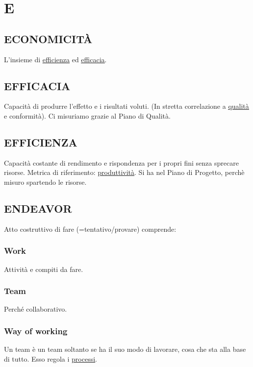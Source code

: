 \newpage
	\section{E} \label{sec:E}
	
		\subsection{ECONOMICITÀ}  \label{economicita}
		L'insieme di \underline{\hyperref[efficienza]{efficienza}} ed \underline{\hyperref[efficacia]{efficacia}}.
		
		\subsection{EFFICACIA}  \label{efficacia}
		Capacità di produrre l'effetto e i risultati voluti. (In stretta correlazione a \underline{\hyperref[qualita]{qualità}} e conformità).
		Ci misuriamo grazie al Piano di Qualità.
		
		\subsection{EFFICIENZA}  \label{efficienza}
		Capacità costante di rendimento e rispondenza per i propri fini senza sprecare risorse. Metrica di riferimento: \underline{\hyperref[produttivita]{produttività}}.
		Si ha nel Piano di Progetto, perchè misuro spartendo le risorse. 
		
		\subsection{ENDEAVOR}  \label{endeavor}
		Atto costruttivo di fare (=tentativo/provare) comprende:
			\subsubsection{Work} \label{work}
			Attività e compiti da fare.
			\subsubsection{Team} \label{team}
			Perché collaborativo.
			\subsubsection{Way of working}	\label{way}
			Un team è un team soltanto se ha il suo modo di lavorare, cosa che sta alla base di tutto. Esso regola i \underline{\hyperref[processo]{processi}}.
		
